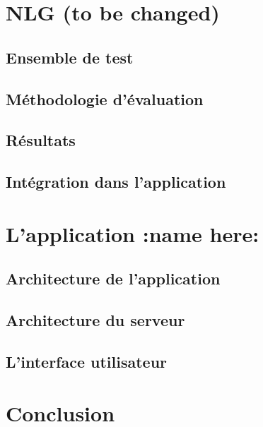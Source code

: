 \section{NLG (to be changed)}
	\subsection{Ensemble de test}
	\subsection{Méthodologie d'évaluation}
	\subsection{Résultats}
	\subsection{Intégration dans l'application}

\section{L'application :name here:}
	\subsection{Architecture de l'application}
	\subsection{Architecture du serveur}
	\subsection{L'interface utilisateur}


\section{Conclusion}

